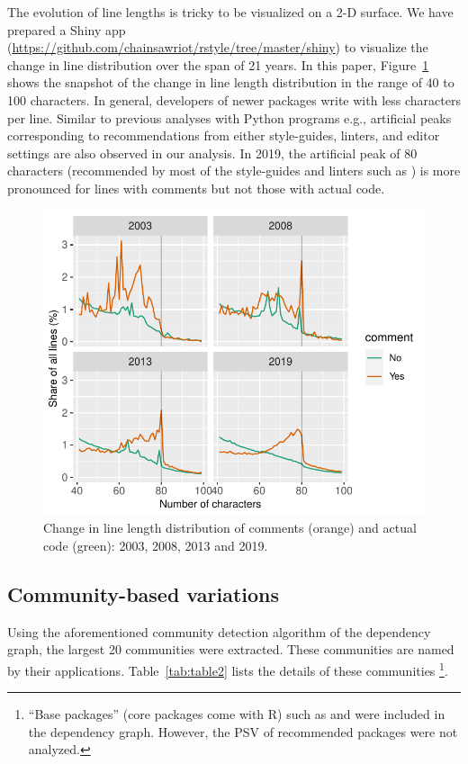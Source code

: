 The evolution of line lengths is tricky to be visualized on a 2-D surface. We have prepared a Shiny app (\url{https://github.com/chainsawriot/rstyle/tree/master/shiny}) to visualize the change in line distribution over the span of 21 years. In this paper, Figure~\ref{figure:fig3} shows the snapshot of the change in line length distribution in the range of 40 to 100 characters. In general, developers of newer packages write with less characters per line. Similar to previous analyses with Python programs e.g.\citet{vanderplas}, artificial peaks corresponding to recommendations from either style-guides, linters, and editor settings are also observed in our analysis. In 2019, the artificial peak of 80 characters (recommended by most of the style-guides and linters such as ) is more pronounced for lines with comments but not those with actual code.

\begin{figure}[htbp]
  \centering
  \includegraphics{fig3}
  \caption{Change in line length distribution of comments (orange) and actual code (green): 2003, 2008, 2013 and 2019.}
  \label{figure:fig3}
\end{figure}


\subsection{Community-based variations}

Using the aforementioned community detection algorithm of the dependency graph, the largest 20 communities were extracted. These communities are named by their applications. Table~\ref{tab:table2} lists the details of these communities \footnote{``Base packages'' (core packages come with R) such as  and  were included in the dependency graph. However, the PSV of recommended packages were not analyzed.}.

